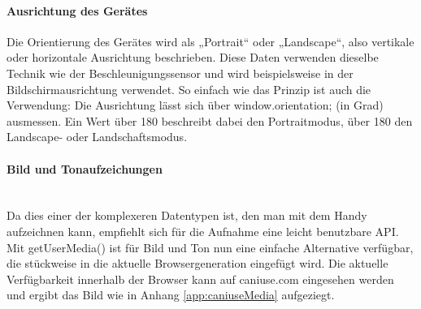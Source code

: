 \documentclass[a4paper]{spie}  %
\begin{document}
\paragraph{Ausrichtung des Gerätes}
Die Orientierung des Gerätes wird als „Portrait“ oder „Landscape“, also vertikale oder horizontale Ausrichtung beschrieben. Diese Daten verwenden dieselbe Technik wie der Beschleunigungssensor und wird beispielsweise in der Bildschirmausrichtung verwendet. So einfach wie das Prinzip ist auch die Verwendung: Die Ausrichtung lässt sich über window.orientation; (in Grad) ausmessen. Ein Wert über 180 beschreibt dabei den Portraitmodus, über 180 den Landscape- oder Landschaftsmodus.

\vspace{0pt}
\paragraph{Bild und Tonaufzeichungen}\mbox{}\\
Da dies einer der komplexeren Datentypen ist, den man mit dem Handy aufzeichnen kann, empfiehlt sich für die Aufnahme eine leicht benutzbare API. Mit getUserMedia() ist für Bild und Ton nun eine einfache Alternative verfügbar, die stückweise in die aktuelle Browsergeneration eingefügt wird. Die aktuelle Verfügbarkeit innerhalb der Browser kann auf caniuse.com eingesehen werden und ergibt das Bild wie in Anhang \ref{app:caniuseMedia} aufgeziegt.


\end{document}
